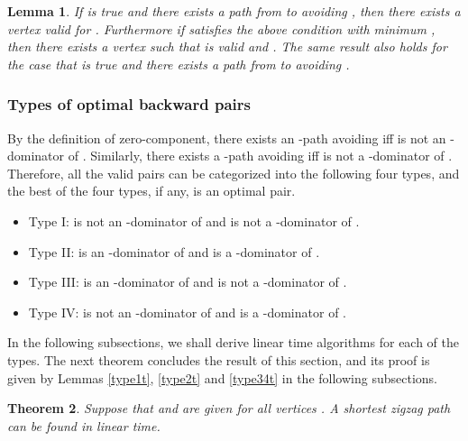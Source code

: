 \documentclass[review]{elsarticle}
\def\squarebox#1{\hbox to #1{\hfill\vbox to #1{\vfill}}}
\renewcommand{\qed}{\hspace*{\fill}
            \vbox{\hrule\hbox{\vrule\squarebox{.667em}\vrule}\hrule}\smallskip\newline}
\newtheorem{thm}{Theorem}
\newtheorem{lem}[thm]{Lemma}
\begin{document}
\begin{lem}\label{redu_y}
If  is true and there exists a path  from  to
 avoiding , then there exists a vertex valid for .
Furthermore if  satisfies the above condition with minimum
, then there exists a vertex  such that  is
valid and . The same result also holds for the case
that  is true and there exists a path from  to 
avoiding .
\end{lem}

\subsubsection*{Types of optimal backward pairs}

By the definition of zero-component, there exists an -path
avoiding  iff  is not an -dominator of .
Similarly, there exists a -path avoiding  iff  is not
a -dominator of . Therefore, all the valid pairs  can
be categorized into the following four types, and the best of the
four types, if any, is an optimal pair.
\begin{itemize}
\item Type I:  is not an -dominator of  and  is not a -dominator of .
\item Type II:  is an -dominator of  and  is a -dominator of .
\item Type III:  is an -dominator of  and  is not a -dominator of .
\item Type IV:  is not an -dominator of  and  is a -dominator of .
\end{itemize}

In the following subsections, we shall derive linear time algorithms
for each of the types. The next theorem concludes the result of this
section, and its proof is given by Lemmas \ref{type1t}, \ref{type2t}
and \ref{type34t} in the following subsections.


\begin{thm}\label{thm:back}
Suppose that  and  are given for all vertices . A
shortest zigzag path can be found in linear time.
\end{thm}
\end{document}
